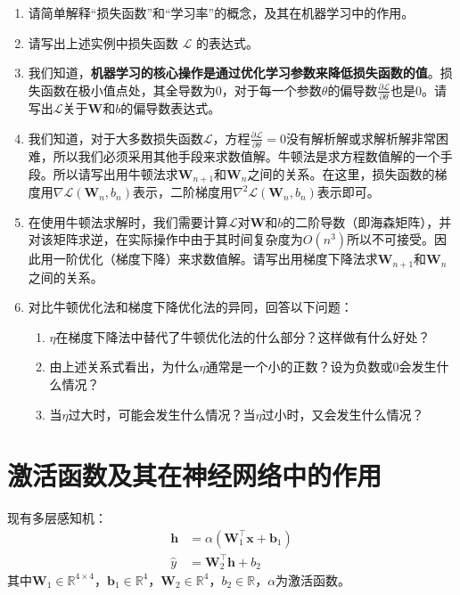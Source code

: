 \documentclass[12pt]{ctexart}
\begin{document}
\begin{enumerate}
    \item 请简单解释“损失函数”和“学习率”的概念，及其在机器学习中的作用。
    \item 请写出上述实例中损失函数 $\mathcal{L}$ 的表达式。
    \item 我们知道，\textbf{机器学习的核心操作是通过优化学习参数来降低损失函数的值}。损失函数在极小值点处，其全导数为0，对于每一个参数$\theta$的偏导数$\frac{\partial \mathcal{L}}{\partial \theta}$也是0。请写出$\mathcal{L}$关于$\mathbf{W}$和$b$的偏导数表达式。
    \item 我们知道，对于大多数损失函数$\mathcal{L}$，方程$\frac{\partial \mathcal{L}}{\partial \theta} = 0$没有解析解或求解析解非常困难，所以我们必须采用其他手段来求数值解。牛顿法是求方程数值解的一个手段。所以请写出用牛顿法求$\mathbf{W}_{n+1}$和$\mathbf{W}_n$之间的关系。在这里，损失函数的梯度用$\nabla\mathcal{L}(\mathbf{W}_n, b_n)$表示，二阶梯度用$\nabla^2\mathcal{L}(\mathbf{W}_n, b_n)$表示即可。
    \item 在使用牛顿法求解时，我们需要计算$\mathcal{L}$对$\mathbf{W}$和$b$的二阶导数（即海森矩阵），并对该矩阵求逆，在实际操作中由于其时间复杂度为$O(n^3)$所以不可接受。因此用一阶优化（梯度下降）来求数值解。请写出用梯度下降法求$\mathbf{W}_{n+1}$和$\mathbf{W}_n$之间的关系。
    \item 对比牛顿优化法和梯度下降优化法的异同，回答以下问题：
    \begin{enumerate}
        \item $\eta$在梯度下降法中替代了牛顿优化法的什么部分？这样做有什么好处？
        \item 由上述关系式看出，为什么$\eta$通常是一个小的正数？设为负数或0会发生什么情况？
        \item 当$\eta$过大时，可能会发生什么情况？当$\eta$过小时，又会发生什么情况？
    \end{enumerate}
\end{enumerate}

\section{激活函数及其在神经网络中的作用}

现有多层感知机：
\begin{align*}
    \mathbf{h} &= \alpha(\mathbf{W}_1^\top \mathbf{x} + \mathbf{b}_1) \\
    \hat{y} &= \mathbf{W}_2^\top \mathbf{h} + b_2
\end{align*}
其中$\mathbf{W}_1 \in \mathbb{R}^{4 \times 4}$，$\mathbf{b}_1 \in \mathbb{R}^4$，$\mathbf{W}_2 \in \mathbb{R}^4$，$b_2 \in \mathbb{R}$，$\alpha$为激活函数。
\end{document}
